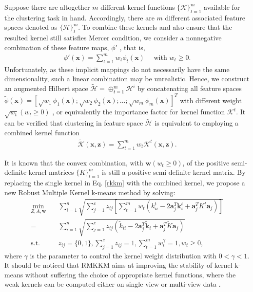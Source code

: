 \documentclass{article}
\newcommand{\st}{\mathrm{s.t.}}
\begin{document}
Suppose there are altogether $m$ different kernel functions $\{\mathcal{K}\}_{t=1}^{m}$ available for the clustering task in hand. Accordingly, there are $m$ different associated feature spaces denoted as $\{\mathcal{H}\}_t^m$. To combine these kernels and also ensure that the resulted kernel still satisfies Mercer condition, we consider a nonnegative combination of these feature maps, $\phi'$ , that is,
\begin{align}
\phi'(\bm{x}) = \sum_{t=1}^{m} w_t \phi_t(\bm{x}) \quad \text{ with } w_t \geq 0.
\end{align}
Unfortunately, as these implicit mappings do not necessarily have the same dimensionality, such a linear combination may be unrealistic.
Hence, we construct an augmented Hilbert space $\mathcal{\tilde{H}} = \oplus_{t=1}^{m} \mathcal{H}^i$ by concatenating all feature spaces $\tilde{\phi}(\bm{x}) = [ \sqrt{w_1} \phi_{1}(\bm{x}); \sqrt{w_2} \phi_{2}(\bm{x}); \ldots; \sqrt{w_m} \phi_{m}(\bm{x}) ]^T$ with different weight $\sqrt{w_t}(w_t \geq 0)$ ,  or
equivalently the importance factor for kernel function $\mathcal{K}^t$. It can be verified that clustering in feature space $\mathcal{\tilde{H}}$ is equivalent to employing a combined kernel function \cite{zeng2011feature}
\begin{align}
\tilde{\mathcal{K}}(\bm{x}, \bm{z}) = \sum_{t=1}^{m} w_t \mathcal{K}^{t}(\bm{x}, \bm{z}).
\end{align}

It is known that the convex combination, with $\bm{w} (w_t \geq 0)$, of the positive semi-definite kernel matrices $\{ K\}_{t=1}^{m}$ is still a positive semi-definite kernel matrix. By replacing the single kernel in Eq. \eqref{rkkm} with the combined kernel, we propose a new Robust Multiple Kernel k-means method by solving:
\begin{align}\label{rmkkm}
    \min_{Z,A,\bm{w}}  \quad&  \sum_{i=1}^{n} \sqrt{\sum_{j=1}^{c} z_{ij}[\sum_{t=1}^{m} w_t( k_{ii}^{t} - 2 \bm{a}_j^T \bm{k}_i^t + \bm{a}_j^T K^t \bm{a}_j )]} \nonumber \\
    =& \sum_{i=1}^{n} \sqrt{\sum_{j=1}^{c} z_{ij}(\tilde{k}_{ii} - 2 \bm{a}_j^T \tilde{\bm{k}}_i + \bm{a}_j^T \tilde{K} \bm{a}_j )} \\
    \st  \quad&z_{ij} = \{0, 1\}, \sum_{j=1}^{c} z_{ij} = 1, \sum_{t=1}^{m} w_t^{\gamma} = 1, w_t \geq 0, \nonumber
\end{align}
where $\gamma$ is the parameter to control the kernel weight distribution with $0 < \gamma < 1$. It should be noticed that RMKKM aims at improving the stability of kernel k-means without suffering the choice of appropriate kernel functions, where the weak kernels can be computed either on single view or multi-view data \cite{cai2013multi}.
\end{document}
